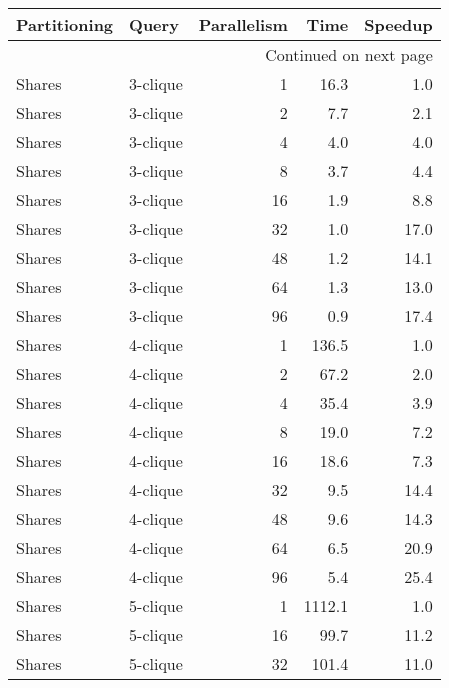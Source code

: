 \begin{longtable}{llr|rr}
\toprule
  Partitioning &     Query &  Parallelism &    Time &  Speedup \\
\midrule
\endhead
\midrule
\multicolumn{5}{r}{{Continued on next page}} \\
\midrule
\endfoot

\bottomrule
\endlastfoot
        Shares &  3-clique &            1 &    16.3 &      1.0 \\
        Shares &  3-clique &            2 &     7.7 &      2.1 \\
        Shares &  3-clique &            4 &     4.0 &      4.0 \\
        Shares &  3-clique &            8 &     3.7 &      4.4 \\
        Shares &  3-clique &           16 &     1.9 &      8.8 \\
        Shares &  3-clique &           32 &     1.0 &     17.0 \\
        Shares &  3-clique &           48 &     1.2 &     14.1 \\
        Shares &  3-clique &           64 &     1.3 &     13.0 \\
        Shares &  3-clique &           96 &     0.9 &     17.4 \\
        Shares &  4-clique &            1 &   136.5 &      1.0 \\
        Shares &  4-clique &            2 &    67.2 &      2.0 \\
        Shares &  4-clique &            4 &    35.4 &      3.9 \\
        Shares &  4-clique &            8 &    19.0 &      7.2 \\
        Shares &  4-clique &           16 &    18.6 &      7.3 \\
        Shares &  4-clique &           32 &     9.5 &     14.4 \\
        Shares &  4-clique &           48 &     9.6 &     14.3 \\
        Shares &  4-clique &           64 &     6.5 &     20.9 \\
        Shares &  4-clique &           96 &     5.4 &     25.4 \\
        Shares &  5-clique &            1 &  1112.1 &      1.0 \\
        Shares &  5-clique &           16 &    99.7 &     11.2 \\
        Shares &  5-clique &           32 &   101.4 &     11.0 \\

\end{longtable}
